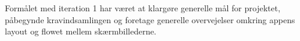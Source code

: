 Formålet med iteration 1 har været at klargøre generelle mål for projektet, påbegynde kravindsamlingen og 
foretage generelle overvejelser omkring appens layout og flowet mellem skærmbillederne.